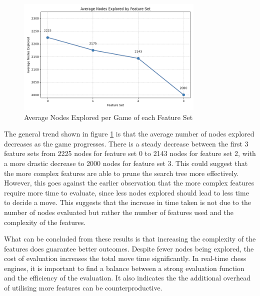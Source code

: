 \begin{figure}[H]
    \centering
    \includegraphics[width=0.8\textwidth]{images/plots/featureSet/Feature_set_vs_avg_nodes_explored.png}
    \caption{Average Nodes Explored per Game of each Feature Set}
    \label{fig: feature_set_vs_avg_nodes_explored}
\end{figure}

The general trend shown in figure \ref{fig: feature_set_vs_avg_nodes_explored} is that the average number of nodes explored decreases as the game progresses. There is a steady decrease between the first 3 feature sets from 2225 nodes for feature set 0 to 2143 nodes for feature set 2, with a more drastic decrease to 2000 nodes for feature set 3. This could suggest that the more complex features are able to prune the search tree more effectively. However, this goes against the earlier observation that the more complex features require more time to evaluate, since less nodes explored should lead to less time to decide a move. This suggests that the increase in time taken is not due to the number of nodes evaluated but rather the number of features used and the complexity of the features. 

What can be concluded from these results is that increasing the complexity of the features does  guarantee better outcomes. Despite fewer nodes being explored, the cost of evaluation increases the total move time significantly. In real-time chess engines, it is important to find a balance between a strong evaluation function and the efficiency of the evaluation. It also indicates the the additional overhead of utilising more features can be counterproductive.











